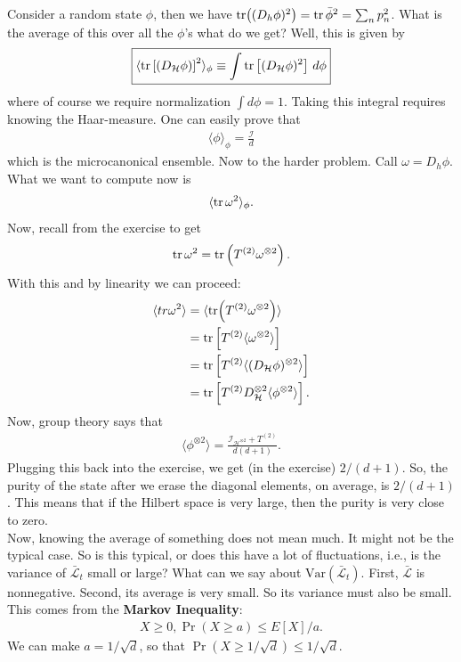 \documentclass{book}
\theoremstyle{definition}
\newcommand{\lag}{\mathcal{L}}
\newcommand{\nn}{\nonumber}
\newcommand{\had}{\mathcal{H}}
\newcommand{\f}[2]{\frac{#1}{#2}}
\newcommand{\lp}{\left(}
\newcommand{\rp}{\right)}
\newcommand{\lb}{\left[}
\newcommand{\rb}{\right]}
\newcommand{\la}{\langle}
\newcommand{\ra}{\rangle}
\newcommand{\Id}{\mathcal{I}}
\begin{document}
Consider a random state $\phi$, then we have $\tr((D_h\phi)^2)=  \tr \bar{\phi}^2 = \sum_n p_n^2$.  What is the average of this over all the $\phi$'s what do we get? Well, this is given by
\begin{align}
\boxed{  \la \tr\lb (D_\had \phi)\rb^2  \ra_\phi \equiv \int \tr\lb (D_\had \phi)^2 \rb \,d\phi} 
\end{align}
where of course we require normalization $\int d\phi = 1$. Taking this integral requires knowing the Haar-measure. One can easily prove that
\begin{align}
\la \phi \ra_\phi = \f{\Id}{d}
\end{align} 
which is the microcanonical ensemble. Now to the harder problem. Call $\omega = D_h \phi$. What we want to compute now is 
\begin{align}
\la \tr \omega^2 \ra_\phi.
\end{align}
Now, recall from the exercise to get
\begin{align}
\tr \omega^2 = \tr\lp T^{(2)} \omega^{\otimes 2} \rp.
\end{align}
With this and by linearity we can proceed:
\begin{align}
\la tr\omega^2 \ra &= \la \tr(T^{(2)} \omega^{\otimes 2}) \ra\nn\\
&= \tr \lb T^{(2)} \la \omega^{\otimes 2} \ra \rb\nn\\
&= \tr\lb T^{(2)} \la (D_\had \phi)^{\otimes 2} \ra \rb\nn\\
&= \tr\lb T^{(2)} D_\had^{\otimes 2} \la \phi^{\otimes 2} \ra \rb.
\end{align}
Now, group theory says that
\begin{align}
\la \phi^{\otimes 2}  \ra = \f{\Id_{\had^{\otimes 2}} + T^{(2)}}{d(d+1)}.
\end{align}
Plugging this back into the exercise, we get (in the exercise) $2/(d+1)$. So, the purity of the state after we erase the diagonal elements, on average, is $2/(d+1)$. This means that if the Hilbert space is very large, then the purity is very close to zero. \\


Now, knowing the average of something does not mean much. It might not be the typical case. So is this typical, or does this have a lot of fluctuations, i.e., is the variance of $\bar{\lag}_t$ small or large? What can we say about $\text{Var}(\bar{\lag}_t)$. First, $\bar{\lag}$ is nonnegative. Second, its average is very small. So its variance must also be small. This comes from the \textbf{Markov Inequality}:
\begin{align}
X\geq 0, \Pr(X \geq a) \leq E[X]/a.
\end{align}
We can make $a=1/\sqrt{d}$, so that $\Pr(X \geq 1/\sqrt{d}) \leq 1/\sqrt{d}$. \\
\end{document}
